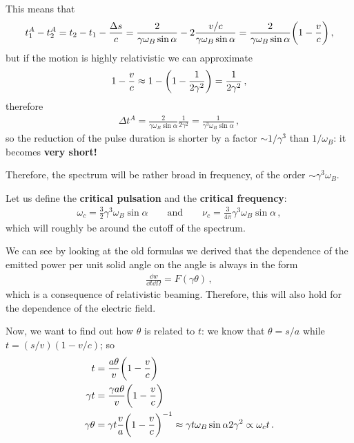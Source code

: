 \documentclass[main.tex]{subfiles}
\begin{document}
This means that 
%
\begin{align}
t_1^A- t_2^{A} = t_2 - t_1 - \frac{\Delta s}{c}  
= \frac{2}{\gamma \omega_B \sin \alpha } - 2 \frac{v/c}{\gamma \omega _B \sin \alpha }
= \frac{2}{\gamma \omega_B \sin \alpha } \qty(1 - \frac{v}{c})
\,,
\end{align}
%
but if the motion is highly relativistic we can approximate 
%
\begin{align}
1 - \frac{v}{c} \approx 1 - \qty(1 - \frac{1}{2 \gamma^2}) = \frac{1}{2 \gamma^2}
\,,
\end{align}
%
therefore 
%
\begin{align}
\Delta t^{A} = \frac{2}{\gamma \omega _B \sin \alpha } \frac{1}{2 \gamma^2} = \frac{1}{\gamma^3 \omega _B \sin \alpha }
\,,
\end{align}
%
so the reduction of the pulse duration is shorter by a factor \(\sim 1/ \gamma^3\) than \(1 / \omega _B\): it becomes \textbf{very short!}

Therefore, the spectrum will be rather broad in frequency, of the order \(\sim \gamma^3 \omega _B\). 

Let us define the \textbf{critical pulsation} and the \textbf{critical frequency}:
%
\begin{align}
\omega _c = \frac{3}{2} \gamma^3 \omega _B \sin \alpha 
\qquad \text{and} \qquad
\nu _c = \frac{3}{4 \pi } \gamma^3 \omega _B \sin \alpha 
\,,
\end{align}
%
which will roughly be around the cutoff of the spectrum. 

We can see by looking at the old formulas we derived that the dependence of the emitted power per unit solid angle on the angle is always in the form 
%
\begin{align}
\frac{ \dd{w}}{ \dd{t} \dd{\Omega }} = F(\gamma \theta )
\,,
\end{align}
%
which is a consequence of relativistic beaming. Therefore, this will also hold for the dependence of the electric field.

Now, we want to find out how \(\theta \) is related to \(t\): we know that \(\theta = s/ a\) while \(t = (s/v) (1 - v/c)\); so 
%
\begin{align}
t &= \frac{a \theta }{v} \qty(1 - \frac{v}{c}) \\
\gamma t &= \frac{\gamma  a \theta }{v} \qty(1 - \frac{v}{c}) \\
\gamma \theta &= \gamma t \frac{v}{a} \qty(1 - \frac{v}{c})^{-1}
\approx \gamma t \omega _B \sin \alpha 2 \gamma^2 \propto \omega _c t
\,.
\end{align}
\end{document}

